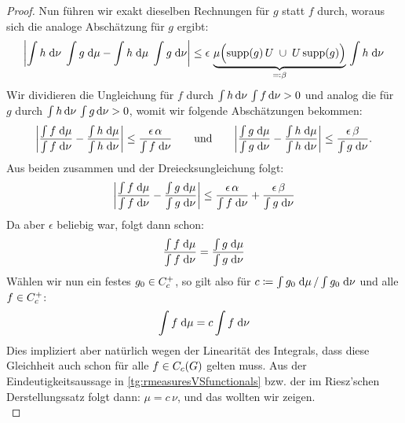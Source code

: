 \begin{proof}
    Nun führen wir exakt dieselben Rechnungen für $g$ statt $f$ durch, woraus
    sich die analoge Abschätzung für $g$ ergibt:
    \begin{equation*}
        \abs*{
            \int h \dif\nu \; \int g \dif\mu
            -   \int h \dif\mu \; \int g \dif\nu
        }
        \leq \epsilon \,
            \underbrace{ \mu\Bigl( \supp(g)\,U \;\cup\; U\supp(g)           %
            \Bigr) }_{ \eqdef \beta }                                       %
            \, \int h \dif\nu                                               %
    \end{equation*}
    Wir dividieren die Ungleichung für $f$ durch 
    $\int h \dif[\,]\nu \, \int f \dif[\,]\nu > 0$ und analog die für $g$ durch 
    $\int h \dif[\,]\nu \, \int g \dif[\,]\nu > 0$, womit wir folgende Abschätzungen
    bekommen:
    \[  \abs*{       \frac{\int f \dif\mu}{\int f \dif\nu} 
                 -   \frac{\int h \dif\mu}{\int h \dif\nu}
             }
             \leq \frac{\epsilon \, \alpha}{\int f \dif\nu}
        \qqundqq
        \abs*{       \frac{\int g \dif\mu}{\int g \dif\nu} 
                 -   \frac{\int h \dif\mu}{\int h \dif\nu}
             }
             \leq \frac{\epsilon \, \beta}{\int g \dif\nu}
    . \]
    Aus beiden zusammen und der Dreiecksungleichung folgt:
    \[  \abs*{       \frac{\int f \dif\mu}{\int f \dif\nu} 
                 -   \frac{\int g \dif\mu}{\int g \dif\nu}
             }
             \leq \frac{\epsilon \, \alpha}{\int f \dif\nu}
                + \frac{\epsilon \, \beta}{\int g \dif\nu}
    \]
    Da aber $\epsilon$ beliebig war, folgt dann schon:
    \[ \frac{\int f \dif\mu}{\int f \dif\nu} 
        = \frac{\int g \dif\mu}{\int g \dif\nu}
    \]
    Wählen wir nun ein festes $g_0\in\contcompplus$, so gilt also für
    $c \defeq \int g_0 \dif\mu\, / \int g_0 \dif\nu$ und alle $f\in\contcompplus$:
    \[ \int f \dif\mu = c  \int f \dif\nu \]
    Dies impliziert aber natürlich wegen der Linearität des Integrals, dass
    diese Gleichheit auch schon für alle $f\in\contcomp(G)$ gelten muss.
    Aus der Eindeutigkeitsaussage in \cref{tg:rmeasuresVSfunctionals} bzw. der
    im Riesz'schen Derstellungssatz  folgt dann:
    $\mu = c\,\nu$, und das wollten wir zeigen.
    \\
\end{proof}


















